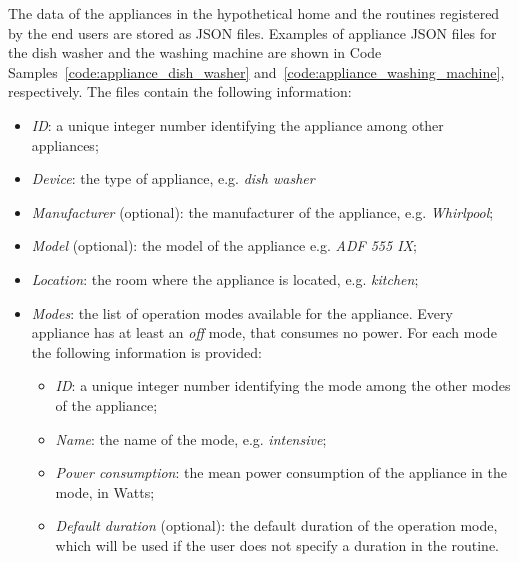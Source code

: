 The data of the appliances in the hypothetical home and the routines registered by the end users are stored as JSON files.
Examples of appliance JSON files for the dish washer and the washing machine are shown in Code Samples~\ref{code:appliance_dish_washer} and~\ref{code:appliance_washing_machine}, respectively. The files contain the following information:
\begin{itemize}
    \item \textit{ID}: a unique integer number identifying the appliance among other appliances;
    \item \textit{Device}: the type of appliance, e.g. \textit{dish washer}
    \item \textit{Manufacturer} (optional): the manufacturer of the appliance, e.g. \textit{Whirlpool};
    \item \textit{Model} (optional): the model of the appliance e.g. \textit{ADF 555 IX};
    \item \textit{Location}: the room where the appliance is located, e.g. \textit{kitchen};
    \item \textit{Modes}: the list of operation modes available for the appliance. Every appliance has at least an \textit{off} mode, that consumes no power. For each mode the following information is provided:
          \begin{itemize}
              \item \textit{ID}: a unique integer number identifying the mode among the other modes of the appliance;
              \item \textit{Name}: the name of the mode, e.g. \textit{intensive};
              \item \textit{Power consumption}: the mean power consumption of the appliance in the mode, in Watts;
              \item \textit{Default duration} (optional): the default duration of the operation mode, which will be used if the user does not specify a duration in the routine.
          \end{itemize}
\end{itemize}






